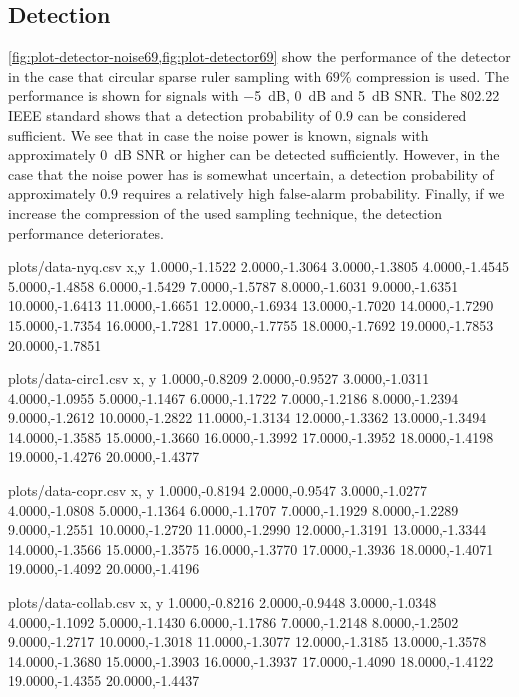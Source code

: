 \documentclass[a4paper, openany, oneside]{memoir}
\begin{document}
\subsection{Detection}
\cref{fig:plot-detector-noise69,fig:plot-detector69} show the performance of the detector in the case that circular sparse ruler sampling with $69\%$ compression is used. The performance is shown for signals with \SI{-5}{dB}, \SI{0}{dB} and \SI{5}{dB} SNR. The 802.22 IEEE standard shows that a detection probability of $0.9$ can be considered sufficient. We see that in case the noise power is known, signals with approximately \SI{0}{dB} SNR or higher can be detected sufficiently. However, in the case that the noise power has is somewhat uncertain, a detection probability of approximately $0.9$ requires a relatively high false-alarm probability. Finally, if we increase the compression of the used sampling technique, the detection performance deteriorates.

\begin{filecontents*}{plots/data-nyq.csv}
x,y
1.0000,-1.1522
2.0000,-1.3064
3.0000,-1.3805
4.0000,-1.4545
5.0000,-1.4858
6.0000,-1.5429
7.0000,-1.5787
8.0000,-1.6031
9.0000,-1.6351
10.0000,-1.6413
11.0000,-1.6651
12.0000,-1.6934
13.0000,-1.7020
14.0000,-1.7290
15.0000,-1.7354
16.0000,-1.7281
17.0000,-1.7755
18.0000,-1.7692
19.0000,-1.7853
20.0000,-1.7851
\end{filecontents*}

\begin{filecontents*}{plots/data-circ1.csv}
x, y
1.0000,-0.8209
2.0000,-0.9527
3.0000,-1.0311
4.0000,-1.0955
5.0000,-1.1467
6.0000,-1.1722
7.0000,-1.2186
8.0000,-1.2394
9.0000,-1.2612
10.0000,-1.2822
11.0000,-1.3134
12.0000,-1.3362
13.0000,-1.3494
14.0000,-1.3585
15.0000,-1.3660
16.0000,-1.3992
17.0000,-1.3952
18.0000,-1.4198
19.0000,-1.4276
20.0000,-1.4377
\end{filecontents*}


\begin{filecontents*}{plots/data-copr.csv}
x, y
1.0000,-0.8194
2.0000,-0.9547
3.0000,-1.0277
4.0000,-1.0808
5.0000,-1.1364
6.0000,-1.1707
7.0000,-1.1929
8.0000,-1.2289
9.0000,-1.2551
10.0000,-1.2720
11.0000,-1.2990
12.0000,-1.3191
13.0000,-1.3344
14.0000,-1.3566
15.0000,-1.3575
16.0000,-1.3770
17.0000,-1.3936
18.0000,-1.4071
19.0000,-1.4092
20.0000,-1.4196
\end{filecontents*}

\begin{filecontents*}{plots/data-collab.csv}
x, y
1.0000,-0.8216
2.0000,-0.9448
3.0000,-1.0348
4.0000,-1.1092
5.0000,-1.1430
6.0000,-1.1786
7.0000,-1.2148
8.0000,-1.2502
9.0000,-1.2717
10.0000,-1.3018
11.0000,-1.3077
12.0000,-1.3185
13.0000,-1.3578
14.0000,-1.3680
15.0000,-1.3903
16.0000,-1.3937
17.0000,-1.4090
18.0000,-1.4122
19.0000,-1.4355
20.0000,-1.4437
\end{filecontents*}
\end{document}
